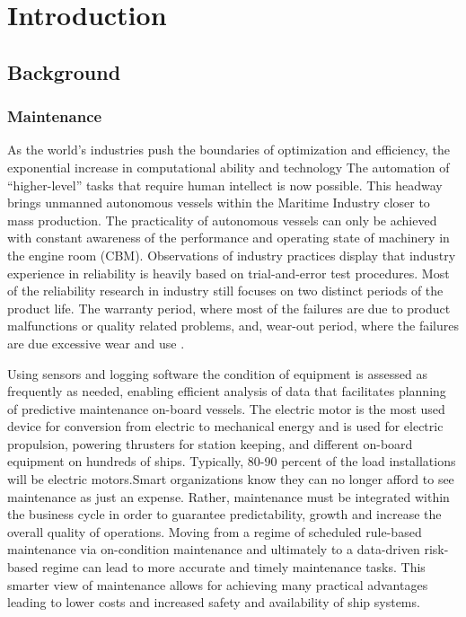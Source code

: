 \section{Introduction}
\label{sec:introduction}
\subsection{Background}
\subsubsection{Maintenance}
As the world’s industries push the boundaries of optimization and efficiency, the exponential increase in computational ability and technology The automation of “higher-level” tasks that require human intellect is now possible. This headway brings unmanned autonomous vessels within the Maritime Industry closer to mass production. The practicality of autonomous vessels can only be achieved with constant awareness of the performance and operating state of machinery in the engine room (CBM). Observations of industry practices display that industry experience in reliability is heavily based on trial-and-error test procedures. Most of the reliability research in industry still focuses on two distinct periods of the product life. The warranty period, where most of the failures are due to product malfunctions or quality related problems, and, wear-out period, where the failures are due excessive wear and use \cite{thomas_warranty_1999}.

 Using sensors and logging software the condition of equipment is assessed as frequently as needed, enabling efficient analysis of data that facilitates planning of predictive maintenance on-board vessels. The electric motor is the most used device for conversion from electric to mechanical energy and is used for electric propulsion, powering thrusters for station keeping, and different on-board equipment on hundreds of ships. Typically, 80-90 percent of the load installations will be electric motors\cite{han_motor_2019}.Smart organizations know they can no longer afford to see maintenance as just an expense. Rather, maintenance must be integrated within the business cycle in order to guarantee predictability, growth and increase the overall quality of operations. Moving from a regime of scheduled rule-based maintenance via on-condition maintenance and ultimately to a data-driven risk-based regime can lead to more accurate and timely maintenance tasks. This smarter view of maintenance allows for achieving many practical advantages leading to lower costs and increased safety and availability of ship systems\cite{han_motor_2019}. 
 
